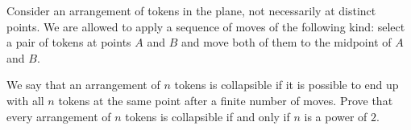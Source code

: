 Consider an arrangement of tokens in the plane, not necessarily at distinct points. We are allowed to apply a sequence of moves of the following kind: select a pair of tokens at points $A$ and $B$ and move both of them to the midpoint of $A$ and $B$.

We say that an arrangement of $n$ tokens is collapsible if it is possible to end up with all $n$ tokens at the same point after a finite number of moves. Prove that every arrangement of $n$ tokens is collapsible if and only if $n$ is a power of $2$.